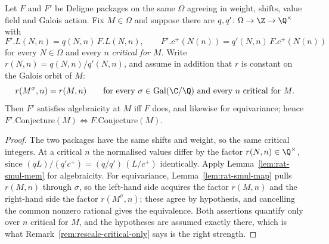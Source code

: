\begin{theorem}
  \label{thm:conjecture-rescale}
  \leanok
  Let $F$ and $F'$ be Deligne packages on the same $\Omega$ agreeing in weight, shifts,
  value field and Galois action. Fix $M \in \Omega$ and suppose there are
  $q, q' \colon \Omega \to \Z \to \Q^{\times}$ with
  \[ F'.L(N,n) = q(N,n)\,F.L(N,n), \qquad F'.c^{+}(N(n)) = q'(N,n)\,F.c^{+}(N(n)) \]
  for every $N \in \Omega$ and every $n$ \emph{critical for $M$}. Write
  $r(N,n) = q(N,n)/q'(N,n)$, and assume in addition that $r$ is constant on the Galois orbit of
  $M$:
  \[ r(M^{\sigma},n) = r(M,n) \qquad \text{for every } \sigma \in \operatorname{Gal}(\C/\Q)
     \text{ and every } n \text{ critical for } M. \]
  Then $F'$ satisfies algebraicity at $M$ iff $F$ does, and likewise for equivariance; hence
  $F'.\mathrm{Conjecture}(M) \iff F.\mathrm{Conjecture}(M)$.
\end{theorem}
\begin{proof}
  \leanok
  The two packages have the same shifts and weight, so the same critical integers. At a
  critical $n$ the normalised values differ by the factor $r(N,n) \in \Q^{\times}$, since
  $(qL)/(q'c^{+}) = (q/q')\,(L/c^{+})$ identically. Apply Lemma~\ref{lem:rat-smul-mem} for
  algebraicity. For equivariance, Lemma~\ref{lem:rat-smul-map} pulls $r(M,n)$ through
  $\sigma$, so the left-hand side acquires the factor $r(M,n)$ and the right-hand side the
  factor $r(M^{\sigma},n)$; these agree by hypothesis, and cancelling the common nonzero
  rational gives the equivalence. Both assertions quantify only over $n$ critical for $M$, and
  the hypotheses are assumed exactly there, which is what
  Remark~\ref{rem:rescale-critical-only} says is the right strength.
\end{proof}

